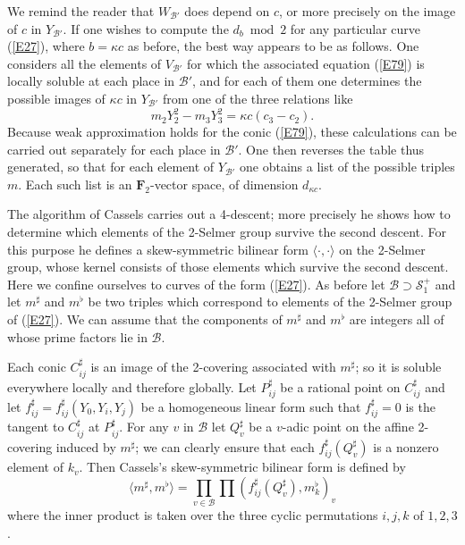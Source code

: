 \documentclass[12pt]{article}
\def\bF{{\mathbf F}}
\def\gk{{\kappa}}
\def\sB{{\mathcal B}}
\def\sS{{\mathcal S}}
\def\beq{\begin{equation} \label}
\begin{document}
We remind the reader that $W_{\sB'}$ does depend on $c$, or
more precisely on the image of $c$ in $Y_{\sB'}$.
If one wishes to compute the $d_b\bmod2$ for any particular
curve (\ref{E27}), where $b=\gk c$ as before, the best way
appears to be as follows. One considers all the elements of
$V_{\sB'}$ for which the associated equation (\ref{E79}) is
locally soluble at each place in $\sB'$, and for each of them
one determines the possible
images of $\gk c$ in $Y_{\sB'}$ from one of the three
relations like
\[ m_2Y_2^2-m_3Y_3^2=\gk c(c_3-c_2). \]
Because weak approximation holds for the conic (\ref{E79}),
these calculations can be carried out separately for each
place in $\sB'$. One then reverses the table thus
generated, so that for each element of $Y_{\sB'}$ one obtains a
list of the possible triples $m$. Each such list is an
$\bF_2$-vector space, of dimension $d_{\gk c}$.

\medskip


The algorithm of Cassels carries out a 4-descent; more
precisely he shows how to determine
which elements of the 2-Selmer group survive the second descent. For this
purpose he defines a skew-symmetric bilinear form $\langle\cdot,\cdot\rangle$
on the 2-Selmer group, whose kernel consists of those elements which survive
the second descent. Here we confine ourselves to curves of the
form (\ref{E27}). As before let $\sB\supset\sS^+_1$ and let $m^\sharp$ and
$m^\flat$ be two triples which correspond to elements of the 2-Selmer group of
(\ref{E27}). We can assume that the components of $m^\sharp$ and $m^\flat$
are integers all of whose prime factors lie in $\sB$.

Each conic $C_{ij}^\sharp$ is an image of the 2-covering associated with
$m^\sharp$; so it is soluble everywhere locally and therefore globally. Let
$P_{ij}^\sharp$ be a rational point on $C_{ij}^\sharp$ and let $f_{ij}^\sharp
=f_{ij}^\sharp(Y_0,Y_i,Y_j)$ be a homogeneous linear form such that 
$f_{ij}^\sharp=0$ is the tangent to $C_{ij}^\sharp$ at $P_{ij}^\sharp$.
For any
$v$ in $\sB$ let $Q_v^\sharp$ be a $v$-adic point on the affine 2-covering
induced by $m^\sharp$; we can clearly ensure that each $f_{ij}^\sharp
(Q_v^\sharp)$ is a nonzero element of $k_v$. Then Cassels's skew-symmetric
bilinear form is defined by
\beq{E34} \langle m^\sharp,m^\flat\rangle ={\prod}_{v\in\sB}\prod(f_{ij}^\sharp
(Q_v^\sharp),m_k^\flat)_v \end{equation}
where the inner product is taken over the three cyclic permutations $i,j,k$ of
$1,2,3$.


\newpage
\end{document}
